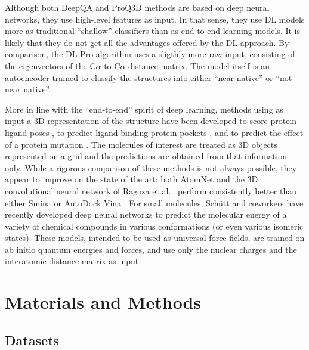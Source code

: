 \documentclass{bioinfo}
\begin{document}
Although both DeepQA and ProQ3D
methods are based on deep neural networks, they use high-level
features as input. In that sense, they use DL models more as
traditional ``shallow'' classifiers than as end-to-end learning
models. It is likely that they do not get all the advantages offered
by the DL approach.
By comparison, the DL-Pro algorithm \citep{nguyen2014dlpro} uses a
sligthly more raw input, consisting of the eigenvectors of the
C$\alpha$-to-C$\alpha$ distance matrix. The model itself is an
autoencoder \citep{hinton2006reducing} trained to classify the
structures into either ``near native'' or ``not near native''.

More in line with the ``end-to-end'' spirit of deep learning, methods
using as input a 3D representation of the structure have been
developed to score protein-ligand poses \citep{wallach2015atomnet,
ragoza2017protein}, to predict ligand-binding protein
pockets \citep{jimenez2017deepsite}, and to predict the effect of a
protein mutation \citep{torng2017}. The molecules of interest are
treated as 3D objects represented on a grid and the predictions are
obtained from that information only. While a rigorous comparison of
these methods is not always possible, they appear to
improve on the state of the art: both
AtomNet \citep{wallach2015atomnet} and the 3D convolutional neural
network of Ragoza et al.\ \citep{ragoza2017protein} perform
consistently better than either Smina \citep{koes2013smina} or AutoDock
Vina \citep{trott2009vina}.
For small molecules, Sch\"{u}tt and coworkers \citep{schutt2017quantum,
schutt2017moleculenet} have recently developed deep neural networks to predict
the molecular energy of a variety of chemical compounds in various
conformations (or even various isomeric states). These models,
intended to be used as universal force fields, are trained on ab
initio quantum energies and forces, and use only the nuclear charges and the
interatomic distance matrix as input.


\section{Materials and Methods}

\subsection{Datasets}
\end{document}
